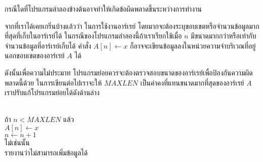 \begin{quiz}{}
กรณี{\wbr}ใด{\wbr}ที่{\wbr}โปรแกรม{\wbr}ลำลอง{\wbr}ข้าง{\wbr}ต้น{\wbr}อาจ{\wbr}ทำให้{\wbr}เกิด{\wbr}ข้อ{\wbr}ผิดพลาด{\wbr}ขึ้น{\wbr}ระหว่าง{\wbr}การ{\wbr}ทำงาน{\wbr}
\end{quiz}
\begin{quizans}
จาก{\wbr}ที่{\wbr}เรา{\wbr}ได้{\wbr}เคย{\wbr}เกริ่น{\wbr}บ้าง{\wbr}แล้ว{\wbr}ว่า ใน{\wbr}การ{\wbr}ใช้งาน{\wbr}อาร์{\wbr}เรย์
โดย{\wbr}มาก{\wbr}จะ{\wbr}ต้อง{\wbr}ระบุ{\wbr}ขอบเขต{\wbr}หรือ{\wbr}จำนวน{\wbr}ข้อมูล{\wbr}มาก{\wbr}ที่สุด{\wbr}ที่{\wbr}เก็บ{\wbr}ใน{\wbr}อาร์{\wbr}เรย์{\wbr}ได้{\wbr}
ใน{\wbr}กรณี{\wbr}ของ{\wbr}โปรแกรม{\wbr}ลำลอง{\wbr}นี้{\wbr}ถ้า{\wbr}เรา{\wbr}เรียก{\wbr}ใช้{\wbr}เมื่อ $n$
มี{\wbr}ขนาด{\wbr}มาก{\wbr}กว่า{\wbr}หรือ{\wbr}เท่ากับ{\wbr}จำนวน{\wbr}ข้อมูล{\wbr}ที่{\wbr}อาร์{\wbr}เรย์{\wbr}เก็บ{\wbr}ได้ คำ{\wbr}สั่ง $A[n]\leftarrow x$
ก็{\wbr}อาจ{\wbr}จะ{\wbr}เขียน{\wbr}ข้อมูล{\wbr}ลง{\wbr}ใน{\wbr}หน่วย{\wbr}ความ{\wbr}จำ{\wbr}บริเวณ{\wbr}ที่{\wbr}อยู่{\wbr}นอก{\wbr}ขอบเขต{\wbr}ของ{\wbr}อาร์{\wbr}เรย์ $A$ ได้{\wbr}
\end{quizans}

ดังนั้น{\wbr}เพื่อ{\wbr}ความ{\wbr}ไม่{\wbr}ประมาท{\wbr}
โปรแกรม{\wbr}ย่อย{\wbr}ควร{\wbr}จะ{\wbr}ต้อง{\wbr}ตรวจสอบ{\wbr}ขนาด{\wbr}ของ{\wbr}อาร์{\wbr}เรย์{\wbr}เพื่อ{\wbr}ป้องกัน{\wbr}ความ{\wbr}ผิดพลาด{\wbr}นี้{\wbr}ด้วย{\wbr}
ใน{\wbr}การ{\wbr}เขียน{\wbr}ต่อ{\wbr}ไป{\wbr}เรา{\wbr}จะ{\wbr}ให้ $MAXLEN$ เป็น{\wbr}ค่า{\wbr}คงที่{\wbr}แทน{\wbr}ขนาด{\wbr}มาก{\wbr}ที่สุด{\wbr}ของ{\wbr}อาร์{\wbr}เรย์ $A$
เรา{\wbr}ปรับ{\wbr}แก้{\wbr}โปรแกรม{\wbr}ย่อย{\wbr}ได้{\wbr}ดัง{\wbr}ด้าน{\wbr}ล่าง{\wbr}

\begin{algt}
\\
\hspace*{0.2in} ถ้า $n < MAXLEN$ แล้ว\\
\hspace*{0.2in}\hspace*{0.2in} $A[n] \leftarrow x$\\
\hspace*{0.2in}\hspace*{0.2in} $n \leftarrow n + 1$\\
\hspace*{0.2in} ไม่{\wbr}เช่น{\wbr}นั้น\\
\hspace*{0.2in}\hspace*{0.2in} รายงาน{\wbr}ว่า{\wbr}ไม่{\wbr}สามารถ{\wbr}เพิ่ม{\wbr}ข้อมูล{\wbr}ได้{\wbr}
\end{algt}


